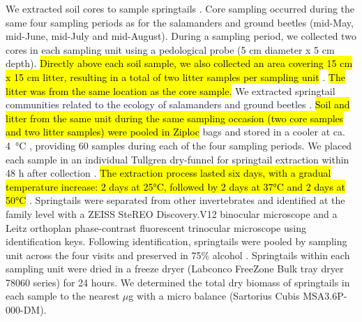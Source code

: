 We extracted soil cores to sample springtails \citep{pongeVerticalDistributionCollembola2000,salamonEffectsPlantDiversity2004,chauvatChangesSoilFaunal2011a,farskaManagementIntensityAffects2014}. 
Core sampling occurred during the same four sampling periods as for the salamanders and ground beetles (mid-May, mid-June, mid-July and mid-August). 
During a sampling period, we collected two cores in each sampling unit using a pedological probe (5 cm diameter x 5 cm depth). 
\hl{Directly above each soil sample, we also collected an area covering 15 cm x 15 cm litter, resulting in a total of two litter samples per sampling unit} \citep{raymond-leonardSpringtailCommunityStructure2018a,rousseauForestFloorMesofauna2018}. 
\hl{The litter was from the same location as the core sample.} 
We extracted springtail communities related to the ecology of salamanders and ground beetles \citep{edwardsAssessmentPopulationsSoilinhabiting1991,chauvatChangesSoilFaunal2011a,raymond-leonardSpringtailCommunityStructure2018a,rousseauForestFloorMesofauna2018}. 
\hl{Soil and litter from the same unit during the same sampling occasion (two core samples and two litter samples) were pooled in Ziploc}\up{\texttrademark{}} bags and stored in a cooler at ca. 4 °C \citep{chauvatChangesSoilFaunal2011a,rousseauForestFloorMesofauna2018}, providing 60 samples during each of the four sampling periods. 
We placed each sample in an individual Tullgren dry-funnel for springtail extraction within 48 h after collection \citep{rusekBiodiversityCollembolaTheir1998,wuCompositionSpatiotemporalVariation2014,rousseauForestFloorMesofauna2018}. 
\hl{The extraction process lasted six days, with a gradual temperature increase: 2 days at 25°C, followed by 2 days at 37°C and 2 days at 50°C} \citep{raymond-leonardSpringtailCommunityStructure2018a}. 
Springtails were separated from other invertebrates and identified at the family level with a ZEISS SteREO Discovery.V12 binocular microscope and a Leitz orthoplan phase-contrast fluorescent trinocular microscope using \cite{bellingerChecklistCollembolaWorld1996} identification keys. 
Following identification, springtails were pooled by sampling unit across the four visits and preserved in 75\% alcohol \citep{wuCompositionSpatiotemporalVariation2014}. 
Springtails within each sampling unit were dried in a freeze dryer (Labconco FreeZone Bulk tray dryer 78060 series) for 24 hours. 
We determined the total dry biomass of springtails in each sample to the nearest $\mu$g with a micro balance (Sartorius Cubis\up{\texttrademark{}} MSA3.6P-000-DM).

